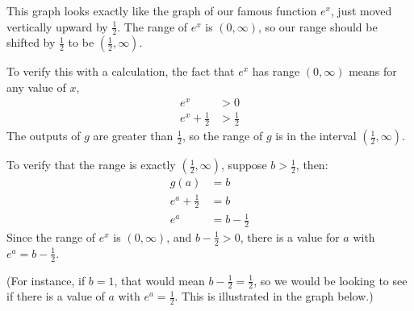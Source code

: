 \documentclass[nooutcomes]{ximera}
\begin{document}
\begin{example}
\begin{explanation}
\begin{enumerate}
\begin{image}
					\end{image}
					This graph looks exactly like the graph of our famous function $e^x$, just moved vertically upward by $\frac{1}{2}$. 
					The range of $e^x$ is $(0, \infty)$, so our range should be shifted by $\frac{1}{2}$ to be $\left( \frac{1}{2}, \infty \right)$. 

					To verify this with a calculation, the fact that $e^x$ has range $(0,\infty)$ means for any value of $x$,
					\begin{align*}
						e^x &> 0\\
						e^x + \frac{1}{2} &> \frac{1}{2}
					\end{align*}
					The outputs of $g$ are greater than $\frac{1}{2}$, so the range of $g$ is in the interval	$\left( \frac{1}{2}, \infty\right)$.
					
					To verify that the range is exactly $\left( \frac{1}{2}, \infty\right)$, suppose $b > \frac{1}{2}$, then:
					\begin{align*}
						g(a) &= b\\
						e^a + \frac{1}{2} &= b\\
						e^a & = b-\frac{1}{2}
					\end{align*}
					Since the range of $e^x$ is $(0, \infty)$, and $b-\frac{1}{2} > 0$, there is a value for $a$ with $e^a = b-\frac{1}{2}$.
					
					(For instance, if $b=1$, that would mean $b-\frac{1}{2} = \frac{1}{2}$, so we would be looking to see if there is a value of $a$  with $e^a = \frac{1}{2}$. This is 
					illustrated in the graph below.)
					\begin{image}
					\end{image}
					

\end{enumerate}
\end{explanation}
\end{example}
\end{document}
